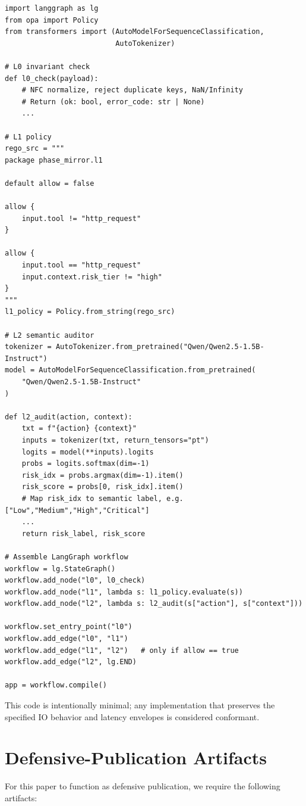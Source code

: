 \documentclass[11pt]{article}
\begin{document}
\begin{verbatim}
import langgraph as lg
from opa import Policy
from transformers import (AutoModelForSequenceClassification,
                          AutoTokenizer)

# L0 invariant check
def l0_check(payload):
    # NFC normalize, reject duplicate keys, NaN/Infinity
    # Return (ok: bool, error_code: str | None)
    ...

# L1 policy
rego_src = """
package phase_mirror.l1

default allow = false

allow {
    input.tool != "http_request"
}

allow {
    input.tool == "http_request"
    input.context.risk_tier != "high"
}
"""
l1_policy = Policy.from_string(rego_src)

# L2 semantic auditor
tokenizer = AutoTokenizer.from_pretrained("Qwen/Qwen2.5-1.5B-Instruct")
model = AutoModelForSequenceClassification.from_pretrained(
    "Qwen/Qwen2.5-1.5B-Instruct"
)

def l2_audit(action, context):
    txt = f"{action} {context}"
    inputs = tokenizer(txt, return_tensors="pt")
    logits = model(**inputs).logits
    probs = logits.softmax(dim=-1)
    risk_idx = probs.argmax(dim=-1).item()
    risk_score = probs[0, risk_idx].item()
    # Map risk_idx to semantic label, e.g. ["Low","Medium","High","Critical"]
    ...
    return risk_label, risk_score

# Assemble LangGraph workflow
workflow = lg.StateGraph()
workflow.add_node("l0", l0_check)
workflow.add_node("l1", lambda s: l1_policy.evaluate(s))
workflow.add_node("l2", lambda s: l2_audit(s["action"], s["context"]))

workflow.set_entry_point("l0")
workflow.add_edge("l0", "l1")
workflow.add_edge("l1", "l2")   # only if allow == true
workflow.add_edge("l2", lg.END)

app = workflow.compile()
\end{verbatim}

This code is intentionally minimal; any implementation that preserves the specified IO behavior and latency envelopes is considered conformant.

\section{Defensive-Publication Artifacts}

For this paper to function as defensive publication, we require the following artifacts:
\end{document}
